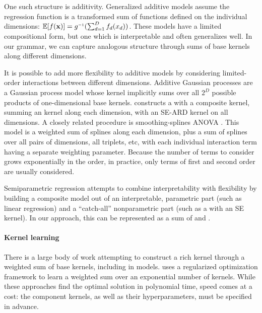 \documentclass[twoside]{article}
\begin{document}
One such structure is additivity.
Generalized additive models assume the regression function is a transformed sum of functions defined on the individual dimensions: $\expect[f(\vx)] = g\inv(\sum_{d=1}^D f_d(x_d))$.
These models have a limited compositional form, but one which is interpretable and often generalizes well.
In our grammar, we can capture analogous structure through sums of base kernels along different dimensions.

It is possible to add more flexibility to additive models by considering limited-order interactions between different dimensions. 
Additive Gaussian processes \cite{duvenaud2011additive11} are a Gaussian process model whose kernel implicitly sums over all $2^D$ possible products of one-dimensional base kernels.  
\cite{plate1999accuracy} constructs a \gp{} with a composite kernel, summing an \kSE{} kernel along each dimension, with an SE-ARD kernel on all dimensions.
A closely related procedure is smoothing-splines ANOVA \cite{wahba1990spline, gu2002smoothing}.
This model is a weighted sum of splines along each dimension, plus a sum of splines over all pairs of dimensions, all triplets, etc, with each individual interaction term having a separate weighting parameter.
Because the number of terms to consider grows exponentially in the order, in practice, only terms of first and second order are usually considered.

Semiparametric regression  attempts to combine interpretability with flexibility by building  a composite model out of an interpretable, parametric part (such as linear regression) and a ``catch-all'' nonparametric part (such as a \gp{} with an SE kernel).
In our approach, this can be represented as a sum of \kSE{} and \kLin{}.

\paragraph{Kernel learning}
There is a large body of work attempting to construct a rich kernel through a weighted sum of base kernels, including in \gp{} models.  
\cite{christoudias2009bayesian}
\cite{Bach_HKL} uses a regularized optimization framework to learn a weighted sum over an exponential number of kernels.
While these approaches find the optimal solution in polynomial time, speed comes at a cost: the component kernels, as well as their hyperparameters, must be specified in advance.
\end{document}
